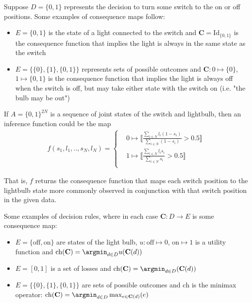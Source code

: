 Suppose $D=\{0,1\}$ represents the decision to turn some switch to the on or off positions. Some examples of consequence maps follow:
\begin{itemize}
	\item $E=\{0,1\}$ is the state of a light connected to the switch and $\mathbf{C}=\mathrm{Id}_{\{0,1\}}$ is the consequence function that implies the light is always in the same state as the switch
	\item $E=\{\{0\},\{1\},\{0,1\}\}$ represents sets of possible outcomes and $\mathbf{C}:0\mapsto \{0\}$, $1\mapsto\{0,1\}$ is the consequence function that implies the light is always off when the switch is off, but may take either state with the switch on (i.e. "the bulb may be out")
\end{itemize}

If $A=\{0,1\}^{2N}$ is a sequence of joint states of the switch and lightbulb, then an inference function could be the map
\begin{align}
	f(s_{1},l_{1},..,s_N,l_N) = \begin{cases}
									&0\mapsto \llbracket\frac{\sum_{i\in N} l_i(1-s_i)}{\sum_{i\in N} (1-s_i)}>0.5\rrbracket\\
									&1\mapsto \llbracket\frac{\sum_{i\in N} l_i s_i}{\sum_{i\in N} s_i}>0.5\rrbracket\\
								\end{cases}
\end{align}

That is, $f$ returns the consequence function that maps each switch position to the lightbulb state more commonly observed in conjunction with that switch position in the given data.

Some examples of decision rules, where in each case $\mathbf{C}:D\to E$ is some consequence map:
\begin{itemize}
	\item $E=\{\mathrm{off},\mathrm{on}\}$ are states of the light bulb, $u:\mathrm{off}\mapsto 0$, $\mathrm{on}\mapsto 1$ is a utility function and $\mathrm{ch}(\mathbf{C}) = \argmin_{d\in D} u(\mathbf{C}(d))$ 
	\item $E=[0,1]$ is a set of losses and $\mathrm{ch}(\mathbf{C}) = \argmin_{d\in D} (\mathbf{C}(d))$
	\item $E=\{\{0\},\{1\},\{0,1\}\}$ are sets of possible outcomes and $\mathrm{ch}$ is the minimax operator: $\mathrm{ch}(\mathbf{C}) = \argmin_{d\in D}\max_{e\in \mathbf{C}(d)} (e)$
\end{itemize}


